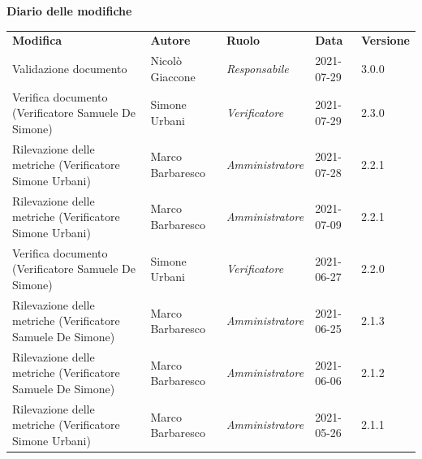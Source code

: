 \documentclass[a4paper]{article}
\begin{document}
\begin{center}
    \textbf{\Large Diario delle modifiche}\\
    \vspace{10px}
    \begin{table}[h!]
        \centering
        \renewcommand{\arraystretch}{1.8}
        \begin{tabular}{p{150px} p{90px} p{70px} p{60px} p{45px}}
            \rowcolor{logo!70} \textbf{Modifica}                                 & \textbf{Autore}   & \textbf{Ruolo}          & \textbf{Data} & \textbf{Versione} \\
            Validazione documento                                                & Nicolò Giaccone   & \textit{Responsabile}   & 2021-07-29    & 3.0.0             \\
            Verifica documento \newline (Verificatore Samuele De Simone)         & Simone Urbani     & \textit{Verificatore}   & 2021-07-29    & 2.3.0             \\
            Rilevazione delle metriche \newline (Verificatore Simone Urbani)     & Marco Barbaresco  & \textit{Amministratore} & 2021-07-28    & 2.2.1             \\
            Rilevazione delle metriche \newline (Verificatore Simone Urbani)     & Marco Barbaresco  & \textit{Amministratore} & 2021-07-09    & 2.2.1             \\
            Verifica documento \newline (Verificatore Samuele De Simone)         & Simone Urbani     & \textit{Verificatore}   & 2021-06-27    & 2.2.0             \\
            Rilevazione delle metriche \newline (Verificatore Samuele De Simone) & Marco Barbaresco  & \textit{Amministratore} & 2021-06-25    & 2.1.3             \\
            Rilevazione delle metriche \newline (Verificatore Samuele De Simone) & Marco Barbaresco  & \textit{Amministratore} & 2021-06-06    & 2.1.2             \\
            Rilevazione delle metriche \newline (Verificatore Simone Urbani)     & Marco Barbaresco  & \textit{Amministratore} & 2021-05-26    & 2.1.1             \\

\end{tabular}
\end{table}
\end{center}
\end{document}
